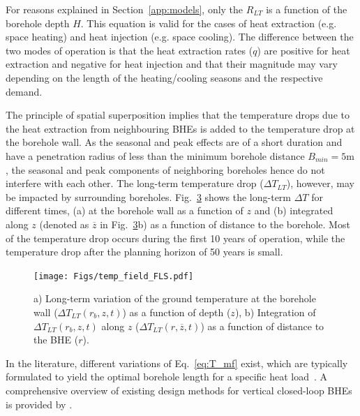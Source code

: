 For reasons explained in Section~\ref{app:models}, only the $R_{LT}$ is a function of the borehole depth $H$.
This equation is valid for the cases of heat extraction (e.g. space heating) and heat injection (e.g. space cooling). The difference between the two modes of operation is that the heat extraction rates ($q$) are positive for heat extraction and negative for heat injection and that their magnitude may vary depending on the length of the heating/cooling seasons and the respective demand.

The principle of spatial superposition implies that the temperature drops due to the heat extraction from neighbouring BHEs is added to the temperature drop at the borehole wall. 
%
As the seasonal and peak effects are of a short duration and have a penetration radius of less than the minimum borehole distance $B_{min} = 5$m \cite{pahud_geothermal_2002}, the seasonal and peak components of neighboring boreholes hence do not interfere with each other.
%
The long-term temperature drop ($\Delta T_{LT}$), however, may be impacted by surrounding boreholes. Fig.~\ref{fig:T_field} shows the long-term $\Delta T$ for different times, (a) at the borehole wall as a function of $z$ and (b) integrated along $z$ (denoted as $\overline{z}$ in Fig.~\ref{fig:T_field}b) as a function of distance to the borehole. Most of the temperature drop occurs during the first 10 years of operation, while the temperature drop after the planning horizon of 50 years is small.

\begin{figure}
    \centering
    \texttt{[image: Figs/temp\_field\_FLS.pdf]}
    \begin{subfigure}[t]{.42\textwidth}
        \centering
    \subcaption{}
      \label{figa:T_field}
    \end{subfigure}
    \begin{subfigure}[t]{.45\textwidth}
      \centering
        \subcaption{}
      \label{figb:T_field}
    \end{subfigure}
    \caption{a) Long-term variation of the ground temperature at the borehole wall ($\Delta T_{LT}(r_b, z, t)$) as a function of depth ($z$), b) Integration of $\Delta T_{LT}(r_b, z, t)$ along $z$ ($\Delta T_{LT}(r, \overline{z}, t)$) as a function of distance to the BHE ($r$).}
    \label{fig:T_field}
\end{figure}

In the literature, different variations of Eq.~\ref{eq:T_mf} exist, which are typically formulated to yield the optimal borehole length for a specific heat load~\cite{kavanaugh_geothermal_2014,sia_sondes_2010}. 
A comprehensive overview of existing design methods for vertical closed-loop BHEs is provided by \citet{spitler_vertical_2016}.

